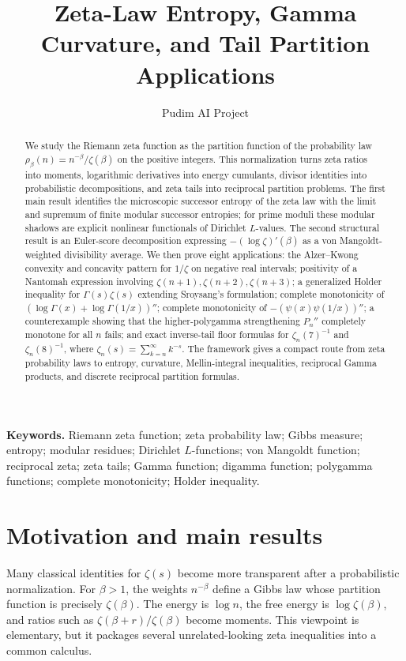 \documentclass[11pt]{article}
\title{Zeta-Law Entropy, Gamma Curvature, and Tail Partition Applications}
\author{Pudim AI Project}
\date{}
\numberwithin{equation}{section}
\theoremstyle{definition}
\theoremstyle{remark}
\newcommand{\1}{\mathbf 1}
\begin{document}
\maketitle

\begin{abstract}
We study the Riemann zeta function as the partition function of the probability law \(\rho_\beta(n)=n^{-\beta}/\zeta(\beta)\) on the positive integers.  This normalization turns zeta ratios into moments, logarithmic derivatives into energy cumulants, divisor identities into probabilistic decompositions, and zeta tails into reciprocal partition problems.  The first main result identifies the microscopic successor entropy of the zeta law with the limit and supremum of finite modular successor entropies; for prime moduli these modular shadows are explicit nonlinear functionals of Dirichlet \(L\)-values.  The second structural result is an Euler-score decomposition expressing \(-(\log\zeta)'(\beta)\) as a von Mangoldt-weighted divisibility average.  We then prove eight applications: the Alzer--Kwong convexity and concavity pattern for \(1/\zeta\) on negative real intervals; positivity of a Nantomah expression involving \(\zeta(n+1),\zeta(n+2),\zeta(n+3)\); a generalized Holder inequality for \(\Gamma(s)\zeta(s)\) extending Sroysang's formulation; complete monotonicity of \((\log\Gamma(x)+\log\Gamma(1/x))''\); complete monotonicity of \(-(\psi(x)\psi(1/x))''\); a counterexample showing that the higher-polygamma strengthening \(P_n''\) completely monotone for all \(n\) fails; and exact inverse-tail floor formulas for \(\zeta_n(7)^{-1}\) and \(\zeta_n(8)^{-1}\), where \(\zeta_n(s)=\sum_{k=n}^{\infty}k^{-s}\).  The framework gives a compact route from zeta probability laws to entropy, curvature, Mellin-integral inequalities, reciprocal Gamma products, and discrete reciprocal partition formulas.
\end{abstract}

\noindent\textbf{Keywords.} Riemann zeta function; zeta probability law; Gibbs measure; entropy; modular residues; Dirichlet \(L\)-functions; von Mangoldt function; reciprocal zeta; zeta tails; Gamma function; digamma function; polygamma functions; complete monotonicity; Holder inequality.

\section{Motivation and main results}

Many classical identities for \(\zeta(s)\) become more transparent after a probabilistic normalization.  For \(\beta>1\), the weights \(n^{-\beta}\) define a Gibbs law whose partition function is precisely \(\zeta(\beta)\).  The energy is \(\log n\), the free energy is \(\log\zeta(\beta)\), and ratios such as \(\zeta(\beta+r)/\zeta(\beta)\) become moments.  This viewpoint is elementary, but it packages several unrelated-looking zeta inequalities into a common calculus.
\end{document}
